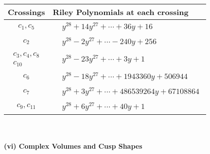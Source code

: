 \documentclass[1p]{elsarticle_modified}
\theoremstyle{definition}
\begin{document}
\begin{tabular}{m{50pt}|m{274pt}}
Crossings & \hspace{64pt}Riley Polynomials at each crossing \\
\hline $$\begin{aligned}c_{1},c_{5}\end{aligned}$$&$\begin{aligned}
&y^{28}+14 y^{27}+\cdots+36 y+16
\end{aligned}$\\
\hline $$\begin{aligned}c_{2}\end{aligned}$$&$\begin{aligned}
&y^{28}-2 y^{27}+\cdots-240 y+256
\end{aligned}$\\
\hline $$\begin{aligned}c_{3},c_{4},c_{8}\\c_{10}\end{aligned}$$&$\begin{aligned}
&y^{28}-23 y^{27}+\cdots+3 y+1
\end{aligned}$\\
\hline $$\begin{aligned}c_{6}\end{aligned}$$&$\begin{aligned}
&y^{28}-18 y^{27}+\cdots+1943360 y+506944
\end{aligned}$\\
\hline $$\begin{aligned}c_{7}\end{aligned}$$&$\begin{aligned}
&y^{28}+3 y^{27}+\cdots+486539264 y+67108864
\end{aligned}$\\
\hline $$\begin{aligned}c_{9},c_{11}\end{aligned}$$&$\begin{aligned}
&y^{28}+6 y^{27}+\cdots+40 y+1
\end{aligned}$\\
\hline
\end{tabular}\\~\\
\newpage\flushleft \textbf{(vi) Complex Volumes and Cusp Shapes}
\end{document}
